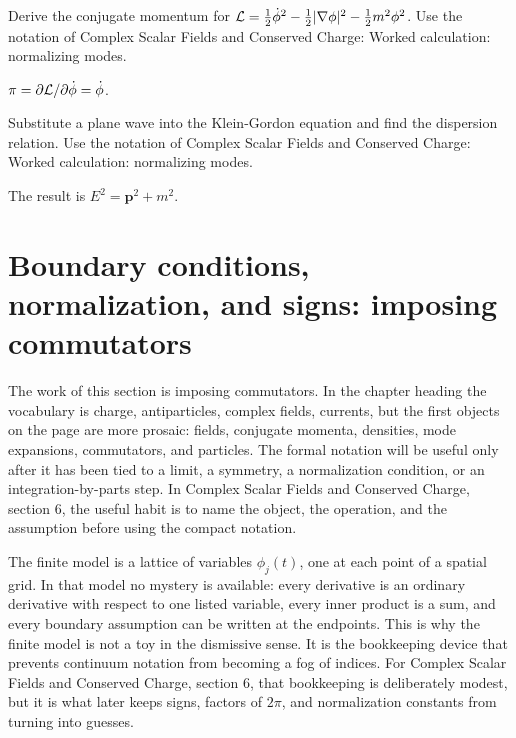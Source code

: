 \begin{exercise}
Derive the conjugate momentum for \(\mathcal L=\frac12\dot\phi^2-\frac12|\nabla\phi|^2-\frac12m^2\phi^2\).  Use the notation of Complex Scalar Fields and Conserved Charge: Worked calculation: normalizing modes.
\begin{answer}
\(\pi=\partial\mathcal L/\partial\dot\phi=\dot\phi\).
\end{answer}
\end{exercise}

\begin{exercise}
Substitute a plane wave into the Klein-Gordon equation and find the dispersion relation.  Use the notation of Complex Scalar Fields and Conserved Charge: Worked calculation: normalizing modes.
\begin{answer}
The result is \(E^2=\bm p^2+m^2\).
\end{answer}
\end{exercise}



\section{Boundary conditions, normalization, and signs: imposing commutators}

The work of this section is imposing commutators.  In the chapter heading the vocabulary is charge, antiparticles, complex fields, currents, but the first objects on the page are more prosaic: fields, conjugate momenta, densities, mode expansions, commutators, and particles.  The formal notation will be useful only after it has been tied to a limit, a symmetry, a normalization condition, or an integration-by-parts step.  In Complex Scalar Fields and Conserved Charge, section 6, the useful habit is to name the object, the operation, and the assumption before using the compact notation.

The finite model is a lattice of variables \(\phi_j(t)\), one at each point of a spatial grid.  In that model no mystery is available: every derivative is an ordinary derivative with respect to one listed variable, every inner product is a sum, and every boundary assumption can be written at the endpoints.  This is why the finite model is not a toy in the dismissive sense.  It is the bookkeeping device that prevents continuum notation from becoming a fog of indices.  For Complex Scalar Fields and Conserved Charge, section 6, that bookkeeping is deliberately modest, but it is what later keeps signs, factors of \(2\pi\), and normalization constants from turning into guesses.


